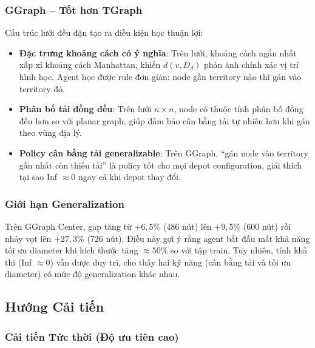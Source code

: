 \documentclass[12pt, a4paper]{article}
\begin{document}
\subsubsection{GGraph -- Tốt hơn TGraph}

Cấu trúc lưới đều đặn tạo ra điều kiện học thuận lợi:
\begin{itemize}
  \item \textbf{Đặc trưng khoảng cách có ý nghĩa}: Trên lưới, khoảng cách ngắn
        nhất xấp xỉ khoảng cách Manhattan, khiến $\bar{d}(v, D_d)$ phản ánh
        chính xác vị trí hình học. Agent học được rule đơn giản: node gần territory
        nào thì gán vào territory đó.
  \item \textbf{Phân bố tải đồng đều}: Trên lưới $n \times n$, node có thuộc tính
        phân bố đồng đều hơn so với planar graph, giúp đảm bảo cân bằng tải
        tự nhiên hơn khi gán theo vùng địa lý.
  \item \textbf{Policy cân bằng tải generalizable}: Trên GGraph, ``gán node vào
        territory gần nhất còn thiếu tải'' là policy tốt cho mọi depot configuration,
        giải thích tại sao Inf $\approx 0$ ngay cả khi depot thay đổi.
\end{itemize}

\subsubsection{Giới hạn Generalization}

Trên GGraph Center, gap tăng từ $+6{,}5\%$ (486 nút) lên $+9{,}5\%$ (600 nút)
rồi nhảy vọt lên $+27{,}3\%$ (726 nút). Điều này gợi ý rằng agent bắt đầu mất
khả năng tối ưu diameter khi kích thước tăng $\approx 50\%$ so với tập train.
Tuy nhiên, tính khả thi (Inf $\approx 0$) vẫn được duy trì, cho thấy hai kỹ năng
(cân bằng tải và tối ưu diameter) có mức độ generalization khác nhau.

\subsection{Hướng Cải tiến}

\subsubsection{Cải tiến Tức thời (Độ ưu tiên cao)}
\end{document}
